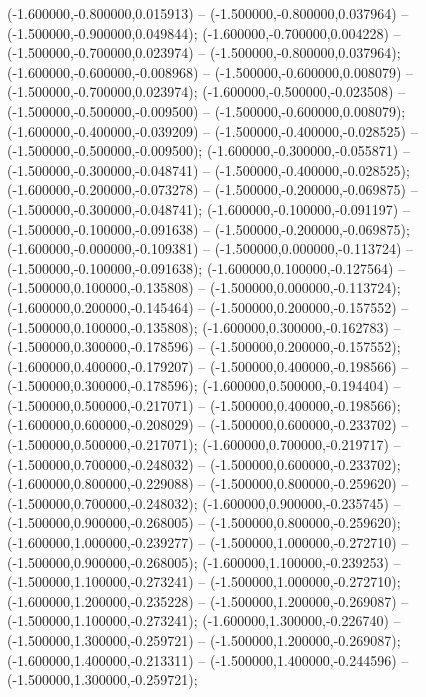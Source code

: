  (-1.600000,-0.800000,0.015913) -- (-1.500000,-0.800000,0.037964) -- (-1.500000,-0.900000,0.049844);
 (-1.600000,-0.700000,0.004228) -- (-1.500000,-0.700000,0.023974) -- (-1.500000,-0.800000,0.037964);
 (-1.600000,-0.600000,-0.008968) -- (-1.500000,-0.600000,0.008079) -- (-1.500000,-0.700000,0.023974);
 (-1.600000,-0.500000,-0.023508) -- (-1.500000,-0.500000,-0.009500) -- (-1.500000,-0.600000,0.008079);
 (-1.600000,-0.400000,-0.039209) -- (-1.500000,-0.400000,-0.028525) -- (-1.500000,-0.500000,-0.009500);
 (-1.600000,-0.300000,-0.055871) -- (-1.500000,-0.300000,-0.048741) -- (-1.500000,-0.400000,-0.028525);
 (-1.600000,-0.200000,-0.073278) -- (-1.500000,-0.200000,-0.069875) -- (-1.500000,-0.300000,-0.048741);
 (-1.600000,-0.100000,-0.091197) -- (-1.500000,-0.100000,-0.091638) -- (-1.500000,-0.200000,-0.069875);
 (-1.600000,-0.000000,-0.109381) -- (-1.500000,0.000000,-0.113724) -- (-1.500000,-0.100000,-0.091638);
 (-1.600000,0.100000,-0.127564) -- (-1.500000,0.100000,-0.135808) -- (-1.500000,0.000000,-0.113724);
 (-1.600000,0.200000,-0.145464) -- (-1.500000,0.200000,-0.157552) -- (-1.500000,0.100000,-0.135808);
 (-1.600000,0.300000,-0.162783) -- (-1.500000,0.300000,-0.178596) -- (-1.500000,0.200000,-0.157552);
 (-1.600000,0.400000,-0.179207) -- (-1.500000,0.400000,-0.198566) -- (-1.500000,0.300000,-0.178596);
 (-1.600000,0.500000,-0.194404) -- (-1.500000,0.500000,-0.217071) -- (-1.500000,0.400000,-0.198566);
 (-1.600000,0.600000,-0.208029) -- (-1.500000,0.600000,-0.233702) -- (-1.500000,0.500000,-0.217071);
 (-1.600000,0.700000,-0.219717) -- (-1.500000,0.700000,-0.248032) -- (-1.500000,0.600000,-0.233702);
 (-1.600000,0.800000,-0.229088) -- (-1.500000,0.800000,-0.259620) -- (-1.500000,0.700000,-0.248032);
 (-1.600000,0.900000,-0.235745) -- (-1.500000,0.900000,-0.268005) -- (-1.500000,0.800000,-0.259620);
 (-1.600000,1.000000,-0.239277) -- (-1.500000,1.000000,-0.272710) -- (-1.500000,0.900000,-0.268005);
 (-1.600000,1.100000,-0.239253) -- (-1.500000,1.100000,-0.273241) -- (-1.500000,1.000000,-0.272710);
 (-1.600000,1.200000,-0.235228) -- (-1.500000,1.200000,-0.269087) -- (-1.500000,1.100000,-0.273241);
 (-1.600000,1.300000,-0.226740) -- (-1.500000,1.300000,-0.259721) -- (-1.500000,1.200000,-0.269087);
 (-1.600000,1.400000,-0.213311) -- (-1.500000,1.400000,-0.244596) -- (-1.500000,1.300000,-0.259721);
